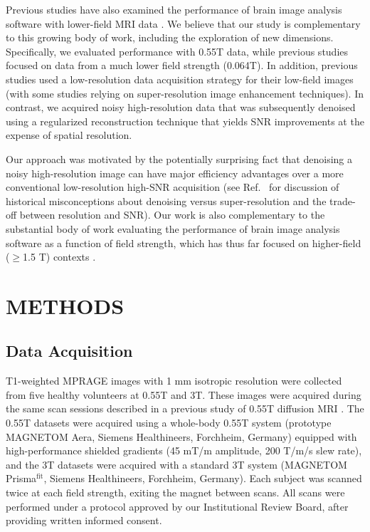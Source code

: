 \documentclass[12pt,letterpaper,onecolumn]{article}
\begin{document}
Previous studies have also examined the performance of brain image analysis software with lower-field MRI data \cite{deoni2021,iglesias2023,cooper2024}.  We believe that our study is complementary to this growing body of work, including the exploration of new dimensions.  Specifically, we evaluated performance with 0.55T data, while previous studies focused on data from a much lower field strength (0.064T).  In addition, previous studies used a low-resolution data acquisition strategy for their low-field images (with some studies relying on super-resolution image enhancement techniques).  In contrast, we acquired noisy high-resolution data that was subsequently denoised using a regularized reconstruction technique that yields SNR improvements at the expense of spatial resolution.  

Our approach was motivated by the potentially surprising fact that denoising a noisy high-resolution image can have major efficiency advantages over a more conventional low-resolution high-SNR acquisition \cite{haldar2008, haldar2011a, haldar2011c, haldar2013} (see Ref.~ for discussion of historical misconceptions about denoising versus super-resolution and the trade-off between resolution and SNR). Our work is also complementary to the substantial body of work evaluating the performance of brain image analysis software as a function of field strength, which has thus far focused on higher-field ($\geq$1.5 T) contexts \cite{dickerson2008,jovicich2009,lusebrink2013,heinen2016,isaacs2020,srinivasan2020}.

  
 
\section{METHODS}\label{sec:methods}
\subsection{Data Acquisition}
T1-weighted MPRAGE images with 1 mm isotropic resolution were collected from five healthy volunteers at 0.55T and 3T.  These images were acquired during the same scan sessions described in a previous study of 0.55T  diffusion MRI \cite{kung2024diffusion}.   The 0.55T datasets were acquired using a whole-body 0.55T system (prototype MAGNETOM Aera, Siemens Healthineers, Forchheim, Germany) equipped with high-performance shielded gradients (45 mT/m amplitude, 200 T/m/s slew rate), and the 3T datasets were acquired with a standard 3T system  (MAGNETOM Prisma$^{\text{fit}}$, Siemens Healthineers, Forchheim, Germany).  Each subject was scanned twice at each field strength, exiting the magnet between scans. All scans were performed under a protocol approved by our Institutional Review Board, after providing written informed consent.
\end{document}
